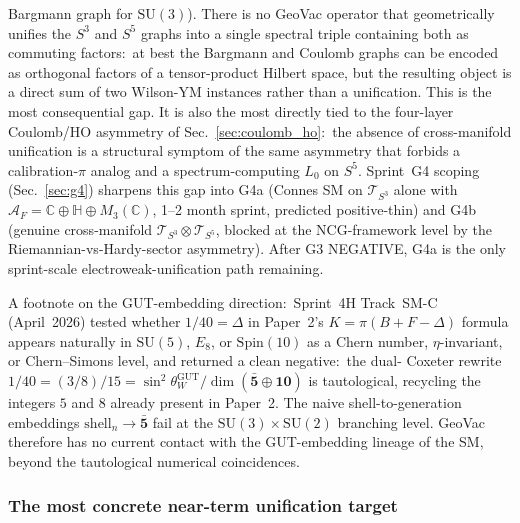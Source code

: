 \documentclass[11pt]{article}
\begin{document}
\begin{enumerate}
Bargmann graph for $\mathrm{SU}(3)$).  There is no GeoVac operator
that geometrically unifies the $S^3$ and $S^5$ graphs into a
single spectral triple containing both as commuting factors:\ at
best the Bargmann and Coulomb graphs can be encoded as orthogonal
factors of a tensor-product Hilbert space, but the resulting
object is a direct sum of two Wilson-YM instances rather than a
unification.  This is the most consequential gap.  It is also the
most directly tied to the four-layer Coulomb/HO asymmetry of
Sec.~\ref{sec:coulomb_ho}:\ the absence of cross-manifold
unification is a structural symptom of the same asymmetry that
forbids a calibration-$\pi$ analog and a spectrum-computing $L_0$
on $S^5$.
Sprint~G4 scoping (Sec.~\ref{sec:g4}) sharpens this gap into G4a
(Connes SM on $\mathcal{T}_{S^3}$ alone with
$\mathcal{A}_F = \mathbb{C} \oplus \mathbb{H} \oplus M_3(\mathbb{C})$,
1--2 month sprint, predicted positive-thin) and G4b (genuine
cross-manifold $\mathcal{T}_{S^3} \otimes \mathcal{T}_{S^5}$, blocked
at the NCG-framework level by the Riemannian-vs-Hardy-sector
asymmetry).  After G3 NEGATIVE, G4a is the only sprint-scale
electroweak-unification path remaining.
\end{enumerate}

A footnote on the GUT-embedding direction:\ Sprint~4H Track~SM-C
(April~2026) tested whether $1/40 = \Delta$ in Paper~2's $K = \pi(B
+ F - \Delta)$ formula appears naturally in $\mathrm{SU}(5)$,
$E_8$, or $\mathrm{Spin}(10)$ as a Chern number, $\eta$-invariant,
or Chern--Simons level, and returned a clean negative:\ the dual-%
Coxeter rewrite $1/40 = (3/8)/15 = \sin^2\theta_W^{\mathrm{GUT}} /
\dim(\mathbf{\bar{5}} \oplus \mathbf{10})$ is tautological,
recycling the integers $5$ and $8$ already present in Paper~2.  The
naive shell-to-generation embeddings $\mathrm{shell}_n \to
\mathbf{\bar{5}}$ fail at the $\mathrm{SU}(3) \times \mathrm{SU}(2)$
branching level.  GeoVac therefore has no current contact with the
GUT-embedding lineage of the SM, beyond the tautological numerical
coincidences.

\subsubsection*{The most concrete near-term unification target}
\end{document}
